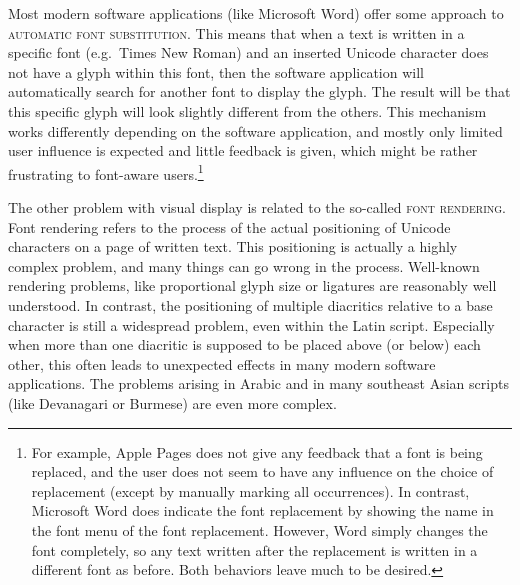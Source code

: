 Most modern software applications (like Microsoft Word) offer some approach to
\textsc{automatic font substitution}. This means that when a text is written in
a specific font (e.g.~Times New Roman) and an inserted Unicode character does not
have a glyph within this font, then the software application will automatically
search for another font to display the glyph. The result will be that this
specific glyph will look slightly different from the others. This mechanism
works differently depending on the software application, and mostly only limited
user influence is expected and little feedback is given, which might be rather
frustrating to font-aware users.\footnote{For example, Apple Pages does not give
any feedback that a font is being replaced, and the user does not seem to have
any influence on the choice of replacement (except by manually marking all
occurrences). In contrast, Microsoft Word does indicate the font replacement by
showing the name in the font menu of the font replacement. However, Word simply
changes the font completely, so any text written after the replacement is written in a
different font as before. Both behaviors leave much to be desired.}

The other problem with visual display is related to the so-called \textsc{font
rendering}. Font rendering refers to the process of the actual positioning of
Unicode characters on a page of written text. This positioning is actually a
highly complex problem, and many things can go wrong in the process. Well-known
rendering problems, like proportional glyph size or ligatures are reasonably
well understood. In contrast, the positioning of multiple diacritics relative to
a base character is still a widespread problem, even within the Latin script.
Especially when more than one diacritic is supposed to be placed above (or
below) each other, this often leads to unexpected effects in many modern
software applications. The problems arising in Arabic and in many southeast
Asian scripts (like Devanagari or Burmese) are even more complex. 

